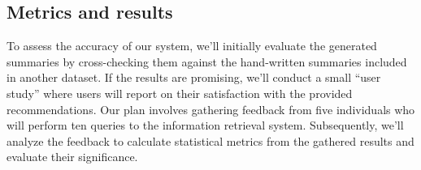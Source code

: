 \documentclass[12pt,a4paper]{article}
\begin{document}
  \subsection{Metrics and results}

  To assess the accuracy of our system, we’ll initially evaluate the generated summaries by cross-checking them against the hand-written summaries included in another dataset.
  If the results are promising, we’ll conduct a small ``user study'' where users will report on their satisfaction with the provided recommendations.
  Our plan involves gathering feedback from five individuals who will perform ten queries to the information retrieval system.
  Subsequently, we’ll analyze the feedback to calculate statistical metrics from the gathered results and evaluate their significance.
\end{document}
